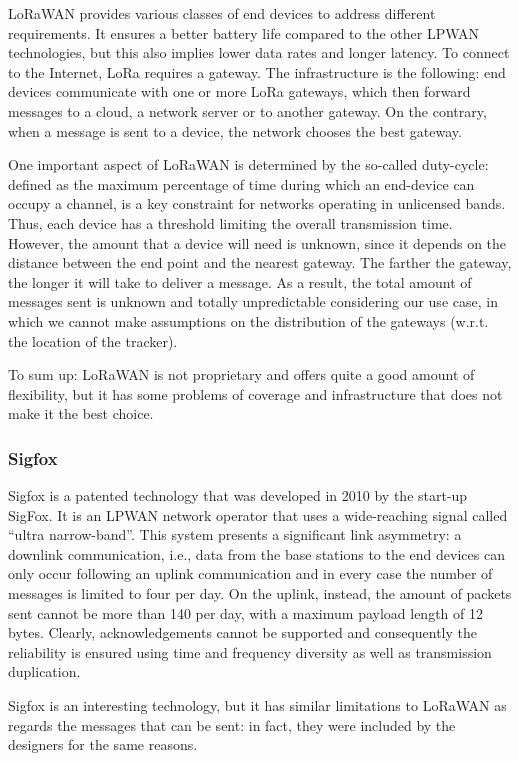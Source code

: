 LoRaWAN provides various classes of end devices to address different requirements. It ensures a better battery life compared to the other LPWAN technologies, but this also implies lower data rates and longer latency. To connect to the Internet, LoRa requires a gateway. The infrastructure is the following: end devices communicate with one or more LoRa gateways, which then forward messages to a cloud, a network server or to another gateway. On the contrary, when a message is sent to a device, the network chooses the best gateway.

One important aspect of LoRaWAN is determined by the so-called duty-cycle: defined as the maximum percentage of time during which an end-device can occupy a channel, is a key constraint for networks operating in unlicensed bands. Thus, each device has a threshold limiting the overall transmission time. However, the amount that a device will need is unknown, since it depends on the distance between the end point and the nearest gateway. The farther the gateway, the longer it will take to deliver a message. As a result, the total amount of messages sent is unknown and totally unpredictable considering our use case, in which we cannot make assumptions on the distribution of the gateways (w.r.t. the location of the tracker).

To sum up: LoRaWAN is not proprietary and offers quite a good amount of flexibility, but it has some problems of coverage and infrastructure that does not make it the best choice.

\subsubsection{Sigfox}
Sigfox is a patented technology that was developed in 2010 by the start-up SigFox. It is an LPWAN network operator that uses a wide-reaching signal called ``ultra narrow-band''. This system presents a significant link asymmetry: a downlink communication, i.e., data from the base stations to the end devices can only occur following an uplink communication and in every case the number of messages is limited to four per day. On the uplink, instead, the amount of packets sent cannot be more than 140 per day, with a maximum payload length of 12 bytes. Clearly, acknowledgements cannot be supported and consequently the reliability is ensured using time and frequency diversity as well as transmission duplication.

Sigfox is an interesting technology, but it has similar limitations to LoRaWAN as regards the messages that can be sent: in fact, they were included by the designers for the same reasons.

